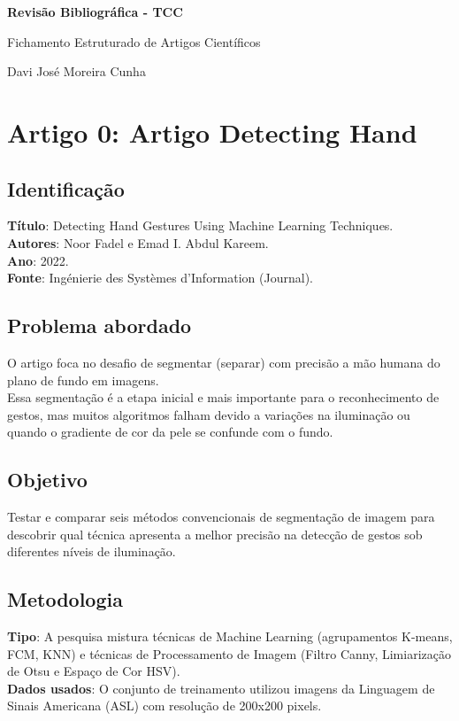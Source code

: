 \documentclass[12pt, a4paper]{article}
\begin{document}
\begin{titlepage}
    \centering
    \vspace*{4cm}
    {\Huge \textbf{\textcolor{primary}{Revisão Bibliográfica - TCC}} \par}
    \vspace{1cm}
    {\Large Fichamento Estruturado de Artigos Científicos \par}
    \vspace{2cm}
    {\large Davi José Moreira Cunha \par}
    \vfill
\end{titlepage}

\tableofcontents
\newpage
\onehalfspacing
\newpage
\section{Artigo 0: Artigo Detecting Hand}
\subsection{Identificação}
\textbf{Título}: Detecting Hand Gestures Using Machine Learning Techniques.\\
\textbf{Autores}: Noor Fadel e Emad I. Abdul Kareem.\\
\textbf{Ano}: 2022.\\
\textbf{Fonte}: Ingénierie des Systèmes d'Information (Journal).\\
\subsection{Problema abordado}
O artigo foca no desafio de segmentar (separar) com precisão a mão humana do plano de fundo em imagens.\\
Essa segmentação é a etapa inicial e mais importante para o reconhecimento de gestos, mas muitos algoritmos falham devido a variações na iluminação ou quando o gradiente de cor da pele se confunde com o fundo.\\
\subsection{Objetivo}
Testar e comparar seis métodos convencionais de segmentação de imagem para descobrir qual técnica apresenta a melhor precisão na detecção de gestos sob diferentes níveis de iluminação.\\
\subsection{Metodologia}
\textbf{Tipo}: A pesquisa mistura técnicas de Machine Learning (agrupamentos K-means, FCM, KNN) e técnicas de Processamento de Imagem (Filtro Canny, Limiarização de Otsu e Espaço de Cor HSV).\\
\textbf{Dados usados}: O conjunto de treinamento utilizou imagens da Linguagem de Sinais Americana (ASL) com resolução de 200x200 pixels.\\
\end{document}
